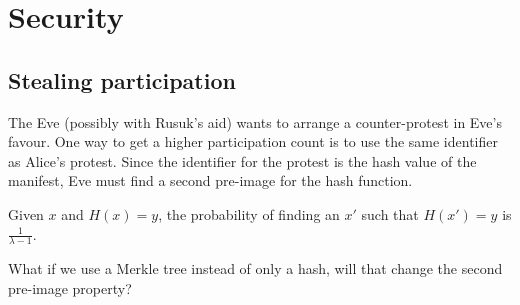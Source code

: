 \mode*

\section{Security}

\subsection{Stealing participation}

The Eve (possibly with Rusuk's aid) wants to arrange a counter-protest in Eve's 
favour.
One way to get a higher participation count is to use the same identifier as 
Alice's protest.
Since the identifier for the protest is the hash value of the manifest, Eve 
must find a second pre-image for the hash function.


\begin{proposition}
  Given \(x\) and \(H(x) = y\), the probability of finding an \(x'\) such that 
  \(H(x') = y\) is \(\frac{1}{\lambda-1}\).
\end{proposition}

\begin{question}
  What if we use a Merkle tree instead of only a hash, will that change the 
  second pre-image property?
\end{question}
